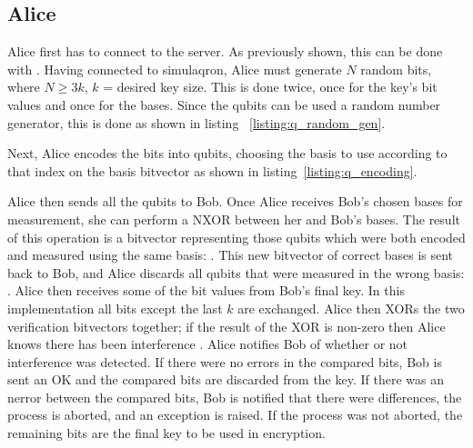 \subsection{Alice}
Alice first has to connect to the server.
As previously shown, this can be done with .
Having connected to simulaqron, Alice must generate $N$ random bits, where $N \geq 3k$, $k$ = desired key size.
This is done twice, once for the key's bit values and once for the bases.
Since the qubits can be used a random number generator, this is done as shown in listing ~\ref{listing:q_random_gen}.
\begin{figure}[htp]
\begin{minipage}{\linewidth}
\begin{singlespace}

\end{singlespace}
\end{minipage}
\end{figure}
Next, Alice encodes the bits into qubits, choosing the basis to use according to that index on the basis bitvector as shown in listing~\ref{listing:q_encoding}.
\begin{figure}[htp]
\noindent
\begin{minipage}{\linewidth}
\begin{singlespace}

\end{singlespace}
\end{minipage}
\end{figure}
Alice then sends all the qubits to Bob.
Once Alice receives Bob's chosen bases for measurement, she can perform a NXOR between her and Bob's bases.
The result of this operation is a bitvector representing those qubits which were both encoded and measured using the same basis: .
This new bitvector of correct bases is sent back to Bob, and Alice discards all qubits that were measured in the wrong basis: .
Alice then receives some of the bit values from Bob's final key.
In this implementation all bits except the last $k$ are exchanged. 
Alice then XORs the two verification bitvectors together; if the result of the XOR is non-zero then Alice knows there has been interference \cite{qc:agi}.
Alice notifies Bob of whether or not interference was detected.
If there were no errors in the compared bits, Bob is sent an OK and the compared bits are discarded from the key.
If there was an nerror between the compared bits, Bob is notified that there were differences, the process is aborted, and an exception is raised.
If the process was not aborted, the remaining bits are the final key to be used in encryption.



